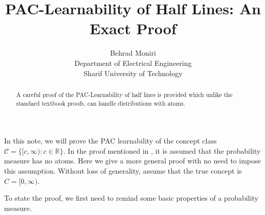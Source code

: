 \documentclass[]{article}
\title{PAC-Learnability of Half Lines: An Exact Proof}
\author{Behrad Moniri\\{\small Department of Electrical Engineering}\\{\small Sharif University of Technology}}
\date{}
\newcommand{\bx}{\mathbf{x}}
\newcommand{\R}{\mathbb{R}}
\begin{document}
\maketitle
\begin{abstract}
	A careful proof of the PAC-Learnability of half lines is provided which unlike the standard textbook proofs, can handle distributions with atoms.
\end{abstract}
\label{sec1}
In this note, we will prove the PAC learnability of the concept class $\mathcal{C} = \big\{[c, \infty): c\in\R\big\}$. In the proof mentioned in \cite{Schapire, mohri}, it is assumed that the probability measure has no atoms. Here we give a more general proof with no need to impose this assumption. Without loss of generality, assume that the true concept is $C = [0, \infty)$.





To state the proof, we first need to remind some basic properties of a probability measure.
\end{document}
